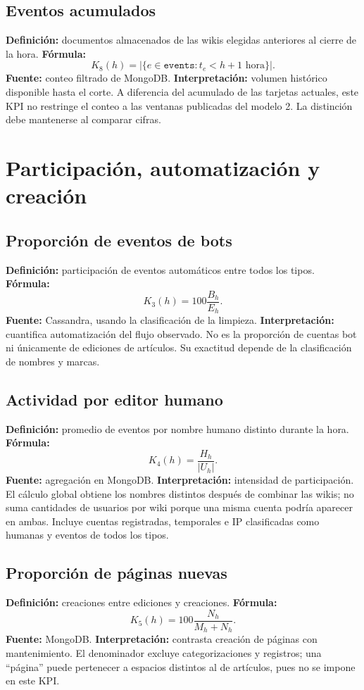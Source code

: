 \subsection{Eventos acumulados}
\textbf{Definición:} documentos almacenados de las wikis elegidas anteriores al cierre de la hora. \textbf{Fórmula:}
\[
K_8(h)=\left|\{e\in\texttt{events}:t_e<h+1\text{ hora}\}\right|.
\]
\textbf{Fuente:} conteo filtrado de MongoDB. \textbf{Interpretación:} volumen histórico disponible hasta el corte. A diferencia del acumulado de las tarjetas actuales, este KPI no restringe el conteo a las ventanas publicadas del modelo 2. La distinción debe mantenerse al comparar cifras.

\section{Participación, automatización y creación}
\subsection{Proporción de eventos de bots}
\textbf{Definición:} participación de eventos automáticos entre todos los tipos. \textbf{Fórmula:}
\[
K_3(h)=100\frac{B_h}{E_h}.
\]
\textbf{Fuente:} Cassandra, usando la clasificación de la limpieza. \textbf{Interpretación:} cuantifica automatización del flujo observado. No es la proporción de cuentas bot ni únicamente de ediciones de artículos. Su exactitud depende de la clasificación de nombres y marcas.

\subsection{Actividad por editor humano}
\textbf{Definición:} promedio de eventos por nombre humano distinto durante la hora. \textbf{Fórmula:}
\[
K_4(h)=\frac{H_h}{|U_h|}.
\]
\textbf{Fuente:} agregación en MongoDB. \textbf{Interpretación:} intensidad de participación. El cálculo global obtiene los nombres distintos después de combinar las wikis; no suma cantidades de usuarios por wiki porque una misma cuenta podría aparecer en ambas. Incluye cuentas registradas, temporales e IP clasificadas como humanas y eventos de todos los tipos.

\subsection{Proporción de páginas nuevas}
\textbf{Definición:} creaciones entre ediciones y creaciones. \textbf{Fórmula:}
\[
K_5(h)=100\frac{N_h}{M_h+N_h}.
\]
\textbf{Fuente:} MongoDB. \textbf{Interpretación:} contrasta creación de páginas con mantenimiento. El denominador excluye categorizaciones y registros; una ``página'' puede pertenecer a espacios distintos al de artículos, pues no se impone  en este KPI.

